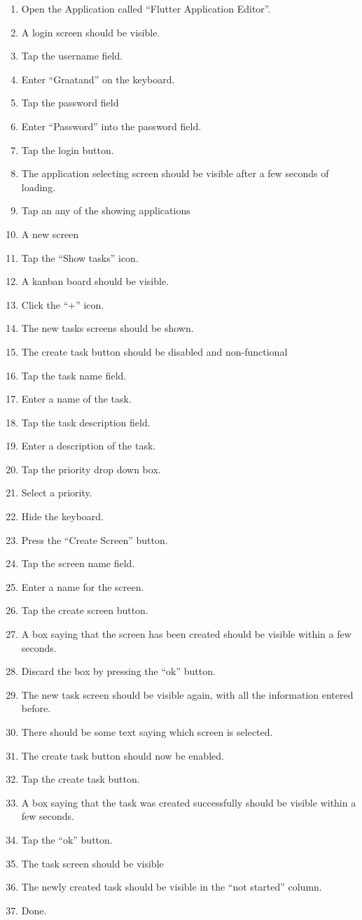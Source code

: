\begin{enumerate}
    \item Open the Application called “Flutter Application Editor”.
    \item A login screen should be visible. 
    \item Tap the username field.
    \item Enter “Graatand” on the keyboard.
    \item Tap the password field
    \item Enter “Password” into the password field.
    \item Tap the login button.
    \item The application selecting screen should be visible after a few seconds of loading.
    \item Tap an any of the showing applications
    \item A new screen 
    \item Tap the “Show tasks” icon.
    \item A kanban board should be visible.
    \item Click the “+” icon.
    \item The new tasks screens should be shown.
    \item The create task button should be disabled and non-functional 
    \item Tap the task name field.
    \item Enter a name of the task.
    \item Tap the task description field.
    \item Enter a description of the task.
    \item Tap the priority drop down box.
    \item Select a priority.
    \item Hide the keyboard.
    \item Press the “Create Screen” button.
    \item Tap the screen name field.
    \item Enter a name for the screen.
    \item Tap the create screen button.
    \item A box saying that the screen has been created should be visible within a few seconds.
    \item Discard the box by pressing the “ok” button.
    \item The new task screen should be visible again, with all the information entered before.
    \item There should be some text saying which screen is selected.
    \item The create task button should now be enabled.
    \item Tap the create task button.
    \item A box saying that the task was created successfully should be visible within a few seconds.
    \item Tap the “ok” button.
    \item The task screen should be visible
    \item The newly created task should be visible in the “not started” column.
    \item Done. 
\end{enumerate}